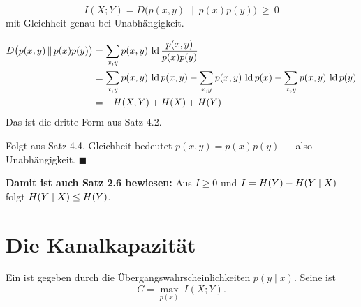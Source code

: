 \begin{merksatz}
\[ I(X;Y) = D\bigl(p(x,y)\,\|\,p(x)p(y)\bigr) \ \ge\ 0 \]
mit Gleichheit genau bei Unabhängigkeit.

\begin{align*}
D\bigl(p(x,y)\,\|\,p(x)p(y)\bigr) &= \sum_{x,y} p(x,y)\,\operatorname{ld}\frac{p(x,y)}{p(x)p(y)}\\
&= \sum_{x,y} p(x,y)\,\operatorname{ld} p(x,y) - \sum_{x,y}p(x,y)\,\operatorname{ld} p(x) - \sum_{x,y}p(x,y)\,\operatorname{ld} p(y)\\
&= -H(X,Y) + H(X) + H(Y)
\end{align*}
Das ist die dritte Form aus Satz 4.2. \checkmark

Folgt aus Satz 4.4. Gleichheit bedeutet $p(x,y) = p(x)p(y)$ --- also Unabhängigkeit. $\blacksquare$

\begin{center}
\begin{minipage}{0.9\textwidth}
\textbf{Damit ist auch Satz 2.6 bewiesen:} Aus $I \ge 0$ und $I = H(Y)-H(Y\mid X)$ folgt $H(Y\mid X) \le H(Y)$.
\end{minipage}
\end{center}

\begin{center}
\begin{minipage}{0.88\textwidth}
\end{minipage}
\end{center}
\end{merksatz}

\section{Die Kanalkapazität}

\begin{definition}
Ein  ist gegeben durch die Übergangswahrscheinlichkeiten $p(y\mid x)$. Seine  ist
\[ C = \max_{p(x)} \ I(X;Y) . \]
\end{definition}

